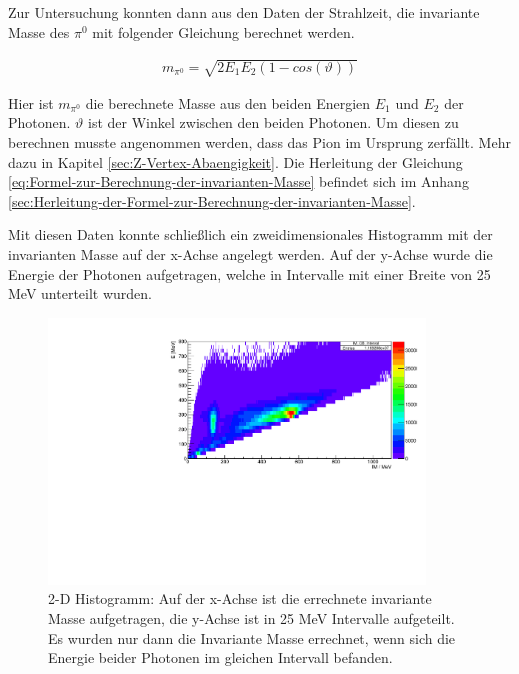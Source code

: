 \documentclass[a4paper,11pt,oneside,final,german,openbib,pdftex]{scrbook}
\begin{document}
{Zur Untersuchung konnten dann aus den Daten der Strahlzeit, die invariante Masse des $\pi^0$ mit folgender Gleichung berechnet werden.

 \begin{equation}
 \begin{split}
 {m_{\pi^0}=\sqrt{2E_1E_2(1-cos(\vartheta))}}
 \label{eq:Formel-zur-Berechnung-der-invarianten-Masse}
 \end{split}
 \end{equation}

Hier ist $m_{\pi^0}$ die berechnete Masse aus den beiden Energien $E_1$ und $E_2$ der Photonen. $\vartheta$ ist der Winkel zwischen den beiden Photonen. Um diesen zu berechnen musste angenommen werden, dass das Pion im Ursprung zerf\"allt. Mehr dazu in Kapitel \ref{sec:Z-Vertex-Abaengigkeit}.
Die Herleitung der Gleichung \ref{eq:Formel-zur-Berechnung-der-invarianten-Masse} befindet sich im Anhang \ref{sec:Herleitung-der-Formel-zur-Berechnung-der-invarianten-Masse}.

Mit diesen Daten konnte schließlich ein zweidimensionales Histogramm mit der invarianten Masse auf der x-Achse angelegt werden. Auf der y-Achse wurde die Energie der Photonen aufgetragen, welche in Intervalle mit einer Breite von 25 MeV unterteilt wurden. 


\begin{figure}[h!]
	\begin{center}
		\includegraphics[width=100mm]{20172803IM_CB_Symmetric}
	
		\caption{2-D Histogramm: Auf der x-Achse ist die errechnete invariante Masse aufgetragen, die y-Achse ist in 25 MeV Intervalle aufgeteilt. Es wurden nur dann die Invariante Masse errechnet, wenn sich die Energie beider Photonen im gleichen Intervall befanden.}
			\label{fig:Energy-Interval-Hist-All-Bins}
	\end{center}
\end{figure}

}
\end{document}
